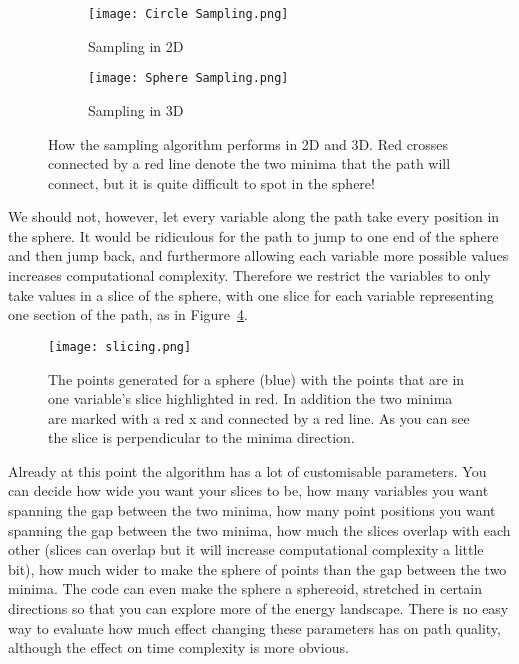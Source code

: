 \begin{figure}[h]
\centering
\begin{subfigure}{.5\textwidth}
  \centering
  \texttt{[image: Circle Sampling.png]}
  \caption{Sampling in 2D}
  \label{fig:circ_samp}
\end{subfigure}%
\begin{subfigure}{.5\textwidth}
  \centering
  \texttt{[image: Sphere Sampling.png]}
  \caption{Sampling in 3D}
  \label{fig:sphere_samp}
\end{subfigure}
\caption{How the sampling algorithm performs in 2D and 3D. Red crosses connected by a red line denote the two minima that the path will connect, but it is quite difficult to spot in the sphere!}
\label{fig:points_samp}
\end{figure}

We should not, however, let every variable along the path take every position in the sphere.
It would be ridiculous for the path to jump to one end of the sphere and then jump back, and furthermore allowing each variable more possible values increases computational complexity.
Therefore we restrict the variables to only take values in a slice of the sphere, with one slice for each variable representing one section of the path, as in Figure~\ref{fig:slice_samp}.

\begin{figure}[h]
    \centering
    \texttt{[image: slicing.png]}
    \caption{The points generated for a sphere (blue) with the points that are in one variable's slice highlighted in red. In addition the two minima are marked with a red x and connected by a red line. As you can see the slice is perpendicular to the minima direction.}
    \label{fig:slice_samp}
\end{figure}

Already at this point the algorithm has a lot of customisable parameters.
You can decide how wide you want your slices to be, how many variables you want spanning the gap between the two minima, how many point positions you want spanning the gap between the two minima, how much the slices overlap with each other (slices can overlap but it will increase computational complexity a little bit), how much wider to make the sphere of points than the gap between the two minima.
The code can even make the sphere a sphereoid, stretched in certain directions so that you can explore more of the energy landscape.
There is no easy way to evaluate how much effect changing these parameters has on path quality, although the effect on time complexity is more obvious.

